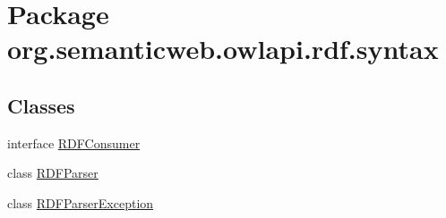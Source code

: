 \hypertarget{namespaceorg_1_1semanticweb_1_1owlapi_1_1rdf_1_1syntax}{\section{Package org.\-semanticweb.\-owlapi.\-rdf.\-syntax}
\label{namespaceorg_1_1semanticweb_1_1owlapi_1_1rdf_1_1syntax}
}
\subsection*{Classes}
\begin{DoxyCompactItemize}
\item 
interface \hyperlink{interfaceorg_1_1semanticweb_1_1owlapi_1_1rdf_1_1syntax_1_1_r_d_f_consumer}{R\-D\-F\-Consumer}
\item 
class \hyperlink{classorg_1_1semanticweb_1_1owlapi_1_1rdf_1_1syntax_1_1_r_d_f_parser}{R\-D\-F\-Parser}
\item 
class \hyperlink{classorg_1_1semanticweb_1_1owlapi_1_1rdf_1_1syntax_1_1_r_d_f_parser_exception}{R\-D\-F\-Parser\-Exception}
\end{DoxyCompactItemize}
